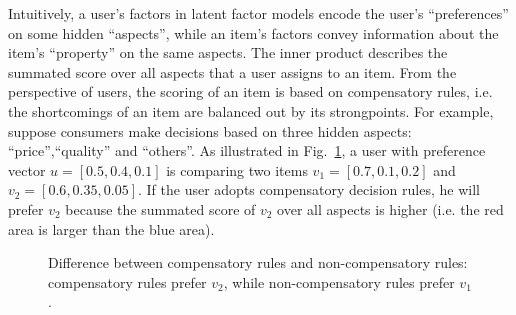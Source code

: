 \documentclass[conference]{IEEEtran}
\begin{document}
Intuitively, a user's factors in latent factor models encode the user's ``preferences'' on some hidden ``aspects'', while an item's factors convey information about the item's ``property'' on the same aspects. The inner product describes the summated score over all aspects that a user assigns to an item. From the perspective of users, the scoring of an item is based on compensatory rules, i.e. the shortcomings of an item are balanced out by its strongpoints. For example, suppose consumers make decisions based on three hidden aspects: ``price'',``quality'' and ``others''. As illustrated in Fig.~\ref{fig:illustration}, a user with preference vector $u=[0.5,0.4,0.1]$ is comparing two items $v_1=[0.7,0.1,0.2]$ and $v_2=[0.6,0.35,0.05]$. If the user adopts compensatory decision rules, he will prefer $v_2$ because the summated score of $v_2$ over all aspects is higher (i.e. the red area is larger than the blue area). 

\begin{figure}[htbp]
\begin{center}
\caption{Difference between compensatory rules and non-compensatory rules: compensatory rules prefer $v_2$, while non-compensatory rules prefer $v_1$. }
\label{fig:illustration}
\end{center}
\end{figure}
\end{document}
